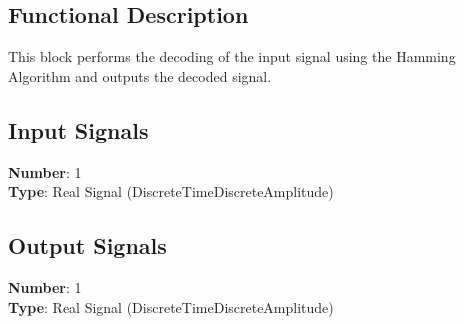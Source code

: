 \subsection*{Functional Description}

This block performs the decoding of the input signal using the Hamming Algorithm and outputs the decoded signal.

\subsection*{Input Signals}

\textbf{Number}: 1\\
\textbf{Type}: Real Signal (DiscreteTimeDiscreteAmplitude)

\subsection*{Output Signals}

\textbf{Number}: 1\\
\textbf{Type}: Real Signal (DiscreteTimeDiscreteAmplitude)

%
